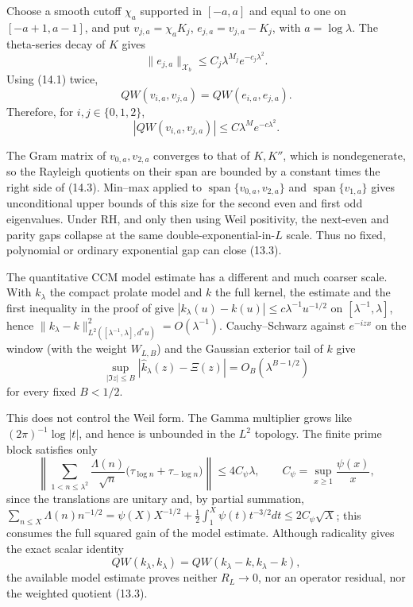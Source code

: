 \documentclass[11pt]{amsart}
\theoremstyle{definition}
\theoremstyle{remark}
\newcommand{\XiR}{\Xi}
\begin{document}
Choose a smooth cutoff \(\chi_a\) supported in \([-a,a]\) and equal to one
on \([-a+1,a-1]\), and put
\(v_{j,a}=\chi_aK_j\), \(e_{j,a}=v_{j,a}-K_j\), with
\(a=\log\lambda\).  The theta-series decay of \(K\) gives
\[
 \|e_{j,a}\|_{\mathcal X_b}
 \le C_j\lambda^{M_j}e^{-c_j\lambda^2}.
\]
Using (14.1) twice,
\[
 QW(v_{i,a},v_{j,a})=QW(e_{i,a},e_{j,a}).
\]
Therefore, for \(i,j\in\{0,1,2\}\),
\[
 \boxed{
 |QW(v_{i,a},v_{j,a})|
 \le C\lambda^Me^{-c\lambda^2}.}
 \tag{14.3}
\]

The Gram matrix of \(v_{0,a},v_{2,a}\) converges to that of \(K,K''\),
which is nondegenerate, so the Rayleigh quotients on their span are
bounded by a constant times the right side of (14.3).
Min--max applied to \(\operatorname{span}\{v_{0,a},v_{2,a}\}\) and
\(\operatorname{span}\{v_{1,a}\}\) gives unconditional upper bounds of
this size for the second even and first odd eigenvalues.  Under RH, and
only then using Weil positivity, the next-even and parity gaps collapse at
the same double-exponential-in-\(L\) scale.  Thus no fixed, polynomial or
ordinary exponential gap can close (13.3).

The quantitative CCM model estimate has a different and much coarser
scale.  With \(k_\lambda\) the compact prolate model and \(k\) the full
kernel, the estimate \cite[(7.8)]{CCM} and the first inequality in the proof of \cite[Lemma~7.3]{CCM} give \(|k_\lambda(u)-k(u)|\le c\lambda^{-1}u^{-1/2}\) on \([\lambda^{-1},\lambda]\), hence \(\|k_\lambda-k\|_{L^2([\lambda^{-1},\lambda],d^*u)}^2=O(\lambda^{-1})\).  Cauchy--Schwarz against
\(e^{-iz x}\) on the window (with the weight \(W_{L,B}\)) and the Gaussian
exterior tail of \(k\) give
\[
 \boxed{
 \sup_{|\Im z|\le B}|\widehat k_\lambda(z)-\XiR(z)|
 =O_B(\lambda^{B-1/2})}
 \tag{14.4}
\]
for every fixed \(B<1/2\).

This does not control the Weil form.  The Gamma multiplier grows like
\((2\pi)^{-1}\log|t|\), and hence is unbounded in the \(L^2\) topology.
The finite prime block satisfies only
\[
 \left\|\sum_{1<n\le\lambda^2}\frac{\Lambda(n)}{\sqrt n}
 \bigl(\tau_{\log n}+\tau_{-\log n}\bigr)\right\|
 \le4C_\psi\lambda,
 \qquad C_\psi=\sup_{x\ge1}\frac{\psi(x)}x,
 \tag{14.5}
\]
since the translations are unitary and, by partial summation,
\(\sum_{n\le X}\Lambda(n)n^{-1/2}
=\psi(X)X^{-1/2}+\tfrac12\int_1^X\psi(t)t^{-3/2}dt\le2C_\psi\sqrt X\);
this consumes the full squared gain of the model estimate.  Although radicality gives
the exact scalar identity
\[
 QW(k_\lambda,k_\lambda)=QW(k_\lambda-k,k_\lambda-k),
 \tag{14.6}
\]
the available model estimate proves neither \(R_L\to0\), nor an operator
residual, nor the weighted quotient (13.3).
\end{document}
